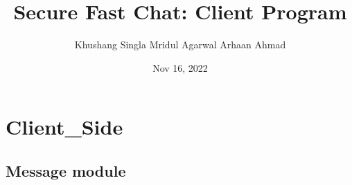\documentclass[letterpaper,10pt,english]{sphinxmanual}
\title{Secure Fast Chat: Client Program}
\date{Nov 16, 2022}
\author{Khushang Singla	Mridul Agarwal	Arhaan Ahmad}
\begin{document}
\pagestyle{empty}
\sphinxmaketitle
\pagestyle{plain}
\sphinxtableofcontents
\pagestyle{normal}
\label{\detokenize{index::doc}}



\chapter{Client\_Side}
\label{\detokenize{modules:client-side}}\label{\detokenize{modules::doc}}

\section{Message module}
\label{\detokenize{Message:module-Message}}\label{\detokenize{Message:message-module}}\label{\detokenize{Message::doc}}
\end{document}
